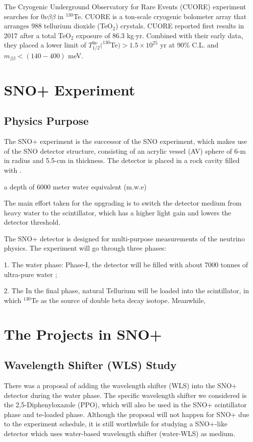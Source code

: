 \documentclass[preprint,12pt]{elsarticle}
\begin{document}
The Cryogenic Underground Observatory for Rare Events (CUORE) experiment searches for $0\nu\beta\beta$ in $^{130}$Te. CUORE is a ton-scale cryogenic bolometer array that arranges 988 tellurium dioxide (TeO$_2$) crystals. CUORE reported first results in 2017 after a total TeO$_2$ exposure of 86.3 kg$\cdot$yr. Combined with their early data, they placed a lower limit of $T^{0\nu}_{1/2}(^{130}$Te$)>1.5\times 10^{25}$ yr at 90\% C.L. and $m_{\beta\beta}<(140-400)$  meV\cite{cuore}.

\section{SNO+ Experiment}
\subsection{Physics Purpose}
The SNO+ experiment is the successor of the SNO experiment, which makes use of the SNO detector structure, consisting of an acrylic vessel (AV) sphere of 6-m in radius and 5.5-cm in thickness. The detector is placed in a rock cavity filled with .  

a depth of 6000 meter water equivalent (m.w.e)

The main effort taken for the upgrading is to switch the detector medium from heavy water to the scintillator, which has a higher light gain and lowers the detector threshold. 

\cite{whitepaper}

The SNO+ detector is designed for multi-purpose measurements of the neutrino physics.
The experiment will go through three phases: 

1. The water phase: 
Phase-I, the detector will be filled with about 7000 tonnes of ultra-pure water ;

2. The
In the final phase, natural Tellurium will be loaded into the scintillator, in which $^{130}$Te as the source of double beta decay isotope.
Meanwhile, 


\section{The Projects in SNO+}
\subsection{Wavelength Shifter (WLS) Study}
There was a proposal of adding the wavelength shifter (WLS) into the SNO+ detector during the water phase. The specific wavelength shifter we considered is the 2,5-Diphenyloxazole (PPO), which will also be used in the SNO+ scintillator phase and te-loaded phase. Although the proposal will not happen for SNO+ due to the experiment schedule, it is still worthwhile for studying a SNO+-like detector which uses water-based wavelength shifter (water-WLS) as medium.
\end{document}
